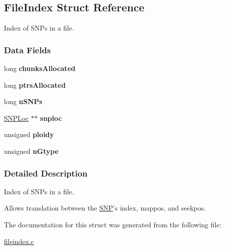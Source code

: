 \hypertarget{struct_file_index}{\subsection{\-File\-Index \-Struct \-Reference}
\label{struct_file_index}
}


\-Index of \-S\-N\-Ps in a file.  


\subsubsection*{\-Data \-Fields}
\begin{DoxyCompactItemize}
\item 
\hypertarget{struct_file_index_a99cc849f084002140a4b69393d0a5e1e}{long {\bfseries chunks\-Allocated}}\label{struct_file_index_a99cc849f084002140a4b69393d0a5e1e}

\item 
\hypertarget{struct_file_index_a63b5730c5e7914c6fb3cd2cc336a01d8}{long {\bfseries ptrs\-Allocated}}\label{struct_file_index_a63b5730c5e7914c6fb3cd2cc336a01d8}

\item 
\hypertarget{struct_file_index_ad4d7df22b65598bbc9e173f71e66d103}{long {\bfseries n\-S\-N\-Ps}}\label{struct_file_index_ad4d7df22b65598bbc9e173f71e66d103}

\item 
\hypertarget{struct_file_index_a6f9626a8f0e1b894970d30ce60e5b908}{\hyperlink{struct_s_n_p_loc}{\-S\-N\-P\-Loc} $\ast$$\ast$ {\bfseries snploc}}\label{struct_file_index_a6f9626a8f0e1b894970d30ce60e5b908}

\item 
\hypertarget{struct_file_index_a0cf1e511c2bdce8f83e7d47e9f0c4545}{unsigned {\bfseries ploidy}}\label{struct_file_index_a0cf1e511c2bdce8f83e7d47e9f0c4545}

\item 
\hypertarget{struct_file_index_af6f2f9432493a019f2b3954c887a7172}{unsigned {\bfseries n\-Gtype}}\label{struct_file_index_af6f2f9432493a019f2b3954c887a7172}

\end{DoxyCompactItemize}


\subsubsection{\-Detailed \-Description}
\-Index of \-S\-N\-Ps in a file. 

\-Allows translation between the \hyperlink{struct_s_n_p}{\-S\-N\-P}'s index, mappos, and seekpos. 

\-The documentation for this struct was generated from the following file\-:\begin{DoxyCompactItemize}
\item 
\hyperlink{fileindex_8c}{fileindex.\-c}\end{DoxyCompactItemize}
